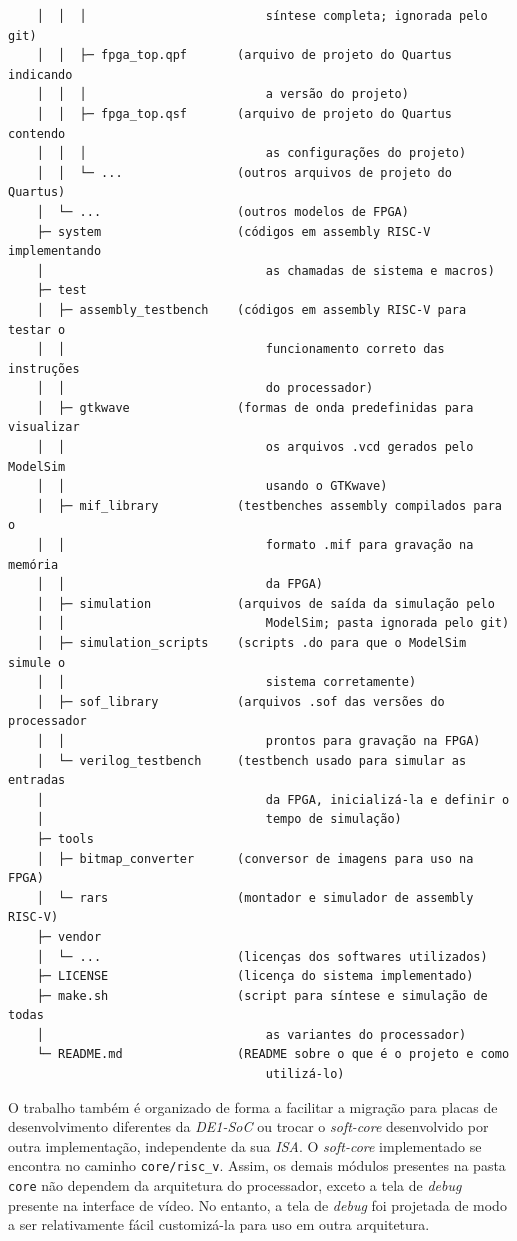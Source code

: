 {\begin{verbatim}
    │  │  │                         síntese completa; ignorada pelo git)
    │  │  ├─ fpga_top.qpf       (arquivo de projeto do Quartus indicando
    │  │  │                         a versão do projeto)
    │  │  ├─ fpga_top.qsf       (arquivo de projeto do Quartus contendo
    │  │  │                         as configurações do projeto)
    │  │  └─ ...                (outros arquivos de projeto do Quartus)
    │  └─ ...                   (outros modelos de FPGA)
    ├─ system                   (códigos em assembly RISC-V implementando
    │                               as chamadas de sistema e macros)
    ├─ test
    │  ├─ assembly_testbench    (códigos em assembly RISC-V para testar o
    │  │                            funcionamento correto das instruções
    │  │                            do processador)
    │  ├─ gtkwave               (formas de onda predefinidas para visualizar
    │  │                            os arquivos .vcd gerados pelo ModelSim
    │  │                            usando o GTKwave)
    │  ├─ mif_library           (testbenches assembly compilados para o
    │  │                            formato .mif para gravação na memória
    │  │                            da FPGA)
    │  ├─ simulation            (arquivos de saída da simulação pelo
    │  │                            ModelSim; pasta ignorada pelo git)
    │  ├─ simulation_scripts    (scripts .do para que o ModelSim simule o
    │  │                            sistema corretamente)
    │  ├─ sof_library           (arquivos .sof das versões do processador
    │  │                            prontos para gravação na FPGA)
    │  └─ verilog_testbench     (testbench usado para simular as entradas
    │                               da FPGA, inicializá-la e definir o
    │                               tempo de simulação)
    ├─ tools
    │  ├─ bitmap_converter      (conversor de imagens para uso na FPGA)
    │  └─ rars                  (montador e simulador de assembly RISC-V)
    ├─ vendor
    │  └─ ...                   (licenças dos softwares utilizados)
    ├─ LICENSE                  (licença do sistema implementado)
    ├─ make.sh                  (script para síntese e simulação de todas
    │                               as variantes do processador)
    └─ README.md                (README sobre o que é o projeto e como
                                    utilizá-lo)
\end{verbatim}
}

{ O trabalho também é organizado de forma a facilitar a migração para placas de
    desenvolvimento diferentes da \textit{DE1-SoC} ou trocar o \textit{soft-core}
    desenvolvido por outra implementação, independente da sua \textit{ISA}.
    O \textit{soft-core} implementado se encontra no caminho
    \texttt{core/risc\_v}. Assim, os demais módulos presentes na pasta \texttt{core}
    não dependem da arquitetura do processador, exceto a tela de
    \textit{debug} presente na interface de vídeo. No entanto, a tela de
    \textit{debug} foi projetada de modo a ser relativamente fácil
    customizá-la para uso em outra arquitetura.
}

